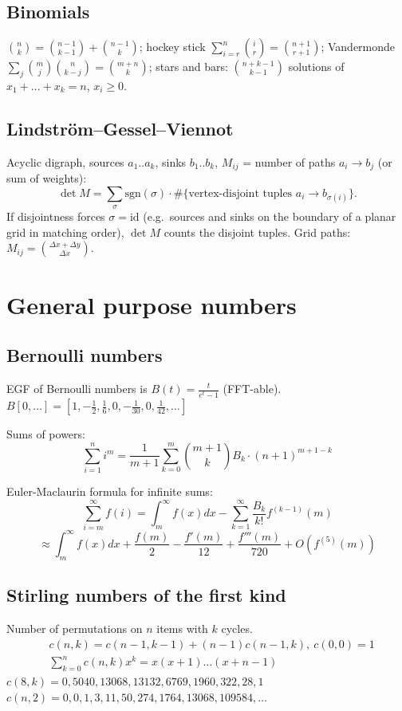 	\subsection{Binomials}
		$\binom nk = \binom{n-1}{k-1} + \binom{n-1}{k}$; hockey stick $\sum_{i=r}^{n}\binom ir = \binom{n+1}{r+1}$;
		Vandermonde $\sum_j \binom mj \binom n{k-j} = \binom{m+n}k$;
		stars and bars: $\binom{n+k-1}{k-1}$ solutions of $x_1+\dots+x_k=n$, $x_i \ge 0$.

	\subsection{Lindstr\"om--Gessel--Viennot}
	Acyclic digraph, sources $a_1..a_k$, sinks $b_1..b_k$, $M_{ij}$ = number of paths $a_i\to b_j$ (or sum of weights):
	\[\det M=\sum_{\sigma}\mathrm{sgn}(\sigma)\cdot\#\{\text{vertex-disjoint tuples }a_i\to b_{\sigma(i)}\}.\]
	If disjointness forces $\sigma=\mathrm{id}$ (e.g.\ sources and sinks on the boundary of a planar grid in matching order), $\det M$ counts the disjoint tuples. Grid paths: $M_{ij}=\binom{\Delta x+\Delta y}{\Delta x}$.

\section{General purpose numbers}
	\subsection{Bernoulli numbers}
		EGF of Bernoulli numbers is $B(t)=\frac{t}{e^t-1}$ (FFT-able).
		$B[0,\ldots] = [1, -\frac{1}{2}, \frac{1}{6}, 0, -\frac{1}{30}, 0, \frac{1}{42}, \ldots]$

		Sums of powers:
		\small
		\[ \sum_{i=1}^n i^m = \frac{1}{m+1} \sum_{k=0}^m \binom{m+1}{k} B_k \cdot (n+1)^{m+1-k} \]
		\normalsize

		Euler-Maclaurin formula for infinite sums:
		\small
		\[ \sum_{i=m}^{\infty} f(i) = \int_m^\infty f(x) dx - \sum_{k=1}^\infty \frac{B_k}{k!}f^{(k-1)}(m) \]
		\[ \approx \int_{m}^\infty f(x)dx + \frac{f(m)}{2} - \frac{f'(m)}{12} + \frac{f'''(m)}{720} + O(f^{(5)}(m)) \]
		\normalsize

	\subsection{Stirling numbers of the first kind}
		Number of permutations on $n$ items with $k$ cycles.
		\begin{align*}
			&c(n,k) = c(n-1,k-1) + (n-1) c(n-1,k),\ c(0,0) = 1 \\
			&\textstyle \sum_{k=0}^n c(n,k)x^k = x(x+1) \dots (x+n-1)
		\end{align*}
		$c(8,k) = 0, 5040, 13068, 13132, 6769, 1960, 322, 28, 1$ \\
		$c(n,2) = 0, 0, 1, 3, 11, 50, 274, 1764, 13068, 109584, \dots$

